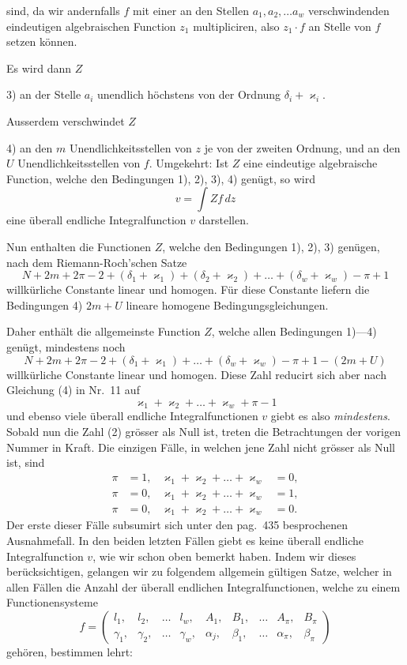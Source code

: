 \documentclass{article}
\begin{document}
sind, da wir andernfalls $f$ mit einer an den Stellen $a_1, a_2, \dots a_w$ verschwindenden eindeutigen algebraischen Function $z_1$ multipliciren, also $z_1 \cdot f$ an Stelle von $f$ setzen können.

Es wird dann $Z$

3) an der Stelle $a_i$ unendlich höchstens von der Ordnung $\delta_i + \varkappa_i$.

Ausserdem verschwindet $Z$

4) an den $m$ Unendlichkeitsstellen von $z$ je von der zweiten Ordnung, und an den $U$ Unendlichkeitsstellen von $f$.
Umgekehrt: Ist $Z$ eine eindeutige algebraische Function, welche den Bedingungen 1), 2), 3), 4) genügt, so wird
\[
v = \int Z f\,dz
\]
eine überall endliche Integralfunction $v$ darstellen.

Nun enthalten die Functionen $Z$, welche den Bedingungen 1), 2), 3) genügen, nach dem Riemann-Roch'schen Satze
\[
N + 2m + 2\pi - 2 + (\delta_1 + \varkappa_1) + (\delta_2 + \varkappa_2) + \dots + (\delta_w + \varkappa_w) - \pi + 1
\]
willkürliche Constante linear und homogen. Für diese Constante liefern die Bedingungen 4) $2m + U$ lineare homogene Bedingungsgleichungen.

Daher enthält die allgemeinste Function $Z$, welche allen Bedingungen 1)---4) genügt, mindestens noch
\[
N + 2m + 2\pi - 2 + (\delta_1 + \varkappa_1) + \dots + (\delta_w + \varkappa_w) - \pi + 1 - (2m + U)
\]
willkürliche Constante linear und homogen. Diese Zahl reducirt sich aber nach Gleichung (4) in Nr.~11 auf
\[
\varkappa_1 + \varkappa_2 + \dots + \varkappa_w + \pi - 1 \tag{2}
\]
und ebenso viele überall endliche Integralfunctionen $v$ giebt es also \emph{mindestens}. Sobald nun die Zahl (2) grösser als Null ist, treten die Betrachtungen der vorigen Nummer in Kraft. Die einzigen Fälle, in welchen jene Zahl nicht grösser als Null ist, sind
\[
\begin{aligned}
\pi &= 1, & \varkappa_1 + \varkappa_2 + \dots + \varkappa_w &= 0, \\
\pi &= 0, & \varkappa_1 + \varkappa_2 + \dots + \varkappa_w &= 1, \\
\pi &= 0, & \varkappa_1 + \varkappa_2 + \dots + \varkappa_w &= 0.
\end{aligned}
\]
Der erste dieser Fälle subsumirt sich unter den pag.~435 besprochenen Ausnahmefall. In den beiden letzten Fällen giebt es keine überall endliche Integralfunction $v$, wie wir schon oben bemerkt haben. Indem wir dieses berücksichtigen, gelangen wir zu folgendem allgemein gültigen Satze, welcher in allen Fällen die Anzahl der überall endlichen Integralfunctionen, welche zu einem Functionensysteme
\[
f = \begin{pmatrix}
l_1, & l_2, & \dots & l_w, & A_1, & B_1, & \dots & A_\pi, & B_\pi \\
\gamma_1, & \gamma_2, & \dots & \gamma_w, & \alpha_j, & \beta_1, & \dots & \alpha_\pi, & \beta_\pi
\end{pmatrix}
\]
gehören, bestimmen lehrt:
\end{document}

